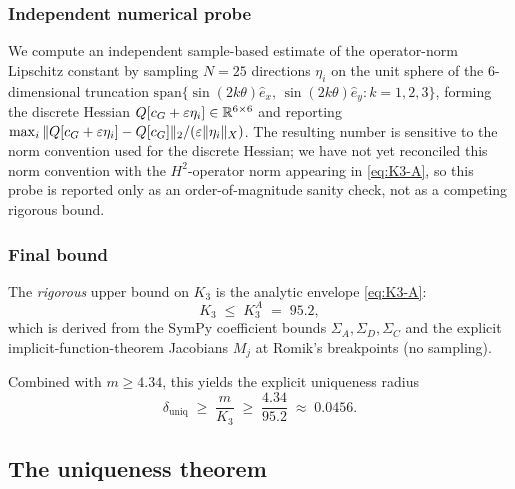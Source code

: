 \subsubsection*{Independent numerical probe}

We compute an independent sample-based estimate of the
operator-norm Lipschitz constant by sampling $N=25$ directions
$\eta_{i}$ on the unit sphere of the $6$-dimensional truncation
$\mathrm{span}\{\sin(2k\theta)\hat e_{x},\,\sin(2k\theta)\hat
e_{y} : k=1,2,3\}$, forming the discrete Hessian
$Q[c_{G}+\varepsilon\eta_{i}]\in\mathbb{R}^{6\times 6}$ and reporting
$\max_{i}\|Q[c_{G}+\varepsilon\eta_{i}]-Q[c_{G}]\|_{2}/(\varepsilon
\|\eta_{i}\|_{X})$.  The resulting number is sensitive to the
norm convention used for the discrete Hessian; we have not yet
reconciled this norm convention with the $H^{2}$-operator norm
appearing in \eqref{eq:K3-A}, so this probe is reported only as
an order-of-magnitude sanity check, not as a competing rigorous
bound.

\subsubsection*{Final bound}

The \emph{rigorous} upper bound on $K_{3}$ is the analytic envelope
\eqref{eq:K3-A}:
\begin{equation}\label{eq:K3-rigorous}
   K_{3} \;\leq\; K_{3}^{A} \;=\; 95.2,
\end{equation}
which is derived from the SymPy coefficient bounds $\Sigma_{A},
\Sigma_{D}, \Sigma_{C}$ and the explicit
implicit-function-theorem Jacobians $M_{j}$ at Romik's
breakpoints (no sampling).

Combined with $m\geq 4.34$, this yields the explicit uniqueness
radius
\begin{equation}\label{eq:delta-uniq-explicit}
   \delta_{\mathrm{uniq}} \;\geq\; \frac{m}{K_{3}}
   \;\geq\; \frac{4.34}{95.2} \;\approx\; 0.0456.
\end{equation}

\subsection{The uniqueness theorem}

